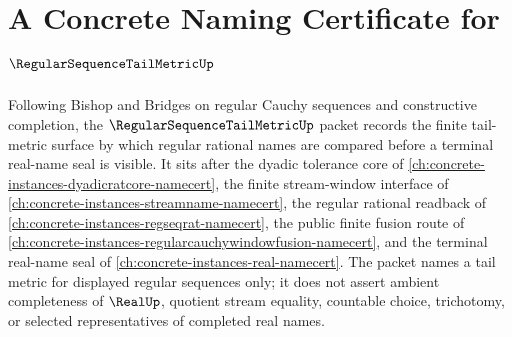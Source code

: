 \chapter{A Concrete Naming Certificate for $\RegularSequenceTailMetricUp$}
\label{ch:concrete-instances-regular-sequence-tail-metric-namecert}

Following Bishop and Bridges on regular Cauchy sequences and constructive completion, the $\RegularSequenceTailMetricUp$ packet records the finite tail-metric surface by which regular rational names are compared before a terminal real-name seal is visible. It sits after the dyadic tolerance core of \autoref{ch:concrete-instances-dyadicratcore-namecert}, the finite stream-window interface of \autoref{ch:concrete-instances-streamname-namecert}, the regular rational readback of \autoref{ch:concrete-instances-regseqrat-namecert}, the public finite fusion route of \autoref{ch:concrete-instances-regularcauchywindowfusion-namecert}, and the terminal real-name seal of \autoref{ch:concrete-instances-real-namecert}. The packet names a tail metric for displayed regular sequences only; it does not assert ambient completeness of $\RealUp$, quotient stream equality, countable choice, trichotomy, or selected representatives of completed real names.

